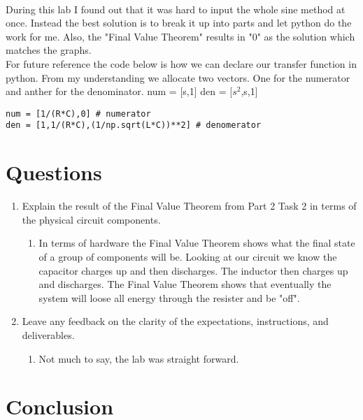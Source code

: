 \documentclass[12pt]{article}
\begin{document}
\\
During this lab I found out that it was hard to input the whole sine method at once.
Instead the best solution is to break it up into parts and let python do the work for me.
Also, the "Final Value Theorem" results in "0" as the solution which matches the graphs.
\\
For future reference the code below is how we can declare our transfer function in python. From my understanding we allocate two vectors. One for the numerator and anther for the denominator. num = [s,1] den = [$s^2$,s,1]

\begin{lstlisting}
num = [1/(R*C),0] # numerator
den = [1,1/(R*C),(1/np.sqrt(L*C))**2] # denomerator
\end{lstlisting}


\section*{Questions}
\begin{enumerate}
    \item Explain the result of the Final Value Theorem from Part 2 Task 2 in terms of the physical
circuit components.
    \begin{enumerate}
        \item In terms of hardware the Final Value Theorem shows what the final state of a group of components will be. Looking at our circuit we know the capacitor charges up and then discharges. The inductor then charges up and discharges. The Final Value Theorem shows that eventually the system will loose all energy through the resister and be "off".
    \end{enumerate}
    \item Leave any feedback on the clarity of the expectations, instructions, and deliverables.
    \begin{enumerate}
        \item Not much to say, the lab was straight forward.
    \end{enumerate}
\end{enumerate}

\section*{Conclusion}
\end{document}
